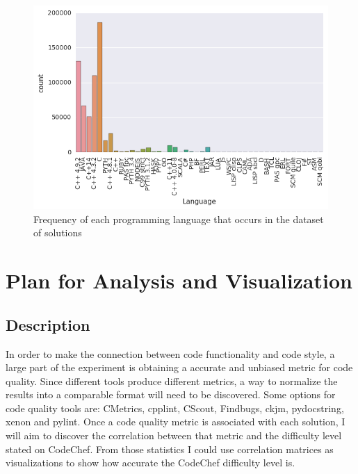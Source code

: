 \documentclass{article}
\begin{document}
\begin{figure}[ht]
\vskip 0.2in
\begin{center}
\centerline{\includegraphics[width=\columnwidth]{images/languages.png}}
\caption{Frequency of each programming language that occurs in the dataset of solutions }
\label{languages}
\end{center}
\vskip -0.2in
\end{figure}

\citet{kernalnlp}

\section{Plan for Analysis and
Visualization}\label{plan-for-analysis-and-visualization}

\subsection{Description}\label{description}

In order to make the connection between code functionality and code
style, a large part of the experiment is obtaining a accurate and
unbiased metric for code quality. Since different tools produce
different metrics, a way to normalize the results into a comparable
format will need to be discovered. Some options for code quality tools
are: CMetrics, cpplint, CScout, Findbugs, ckjm, pydocstring, xenon and
pylint. Once a code quality metric is associated with each solution, I
will aim to discover the correlation between that metric and the
difficulty level stated on CodeChef. From those statistics I could use
correlation matrices as visualizations to show how accurate the CodeChef
difficulty level is.
\end{document}
